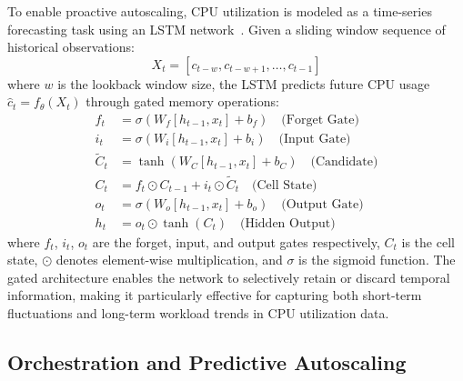 \documentclass[sn-nature]{sn-jnl}
\theoremstyle{thmstyleone}
\theoremstyle{thmstyletwo}
\theoremstyle{thmstylethree}
\begin{document}
To enable proactive autoscaling, CPU utilization is modeled as a time-series forecasting task using an LSTM network~\cite{hochreiter1997lstm}.
Given a sliding window sequence of historical observations:
\begin{equation}
X_t = [c_{t-w}, c_{t-w+1}, \ldots, c_{t-1}]
\end{equation}
where $w$ is the lookback window size, the LSTM predicts future CPU usage $\hat{c}_t = f_{\theta}(X_t)$ through gated memory operations:
\begin{align}
f_t &= \sigma(W_f [h_{t-1}, x_t] + b_f) \quad \text{(Forget Gate)} \label{eq:forget}\\
i_t &= \sigma(W_i [h_{t-1}, x_t] + b_i) \quad \text{(Input Gate)} \label{eq:input}\\
\tilde{C}_t &= \tanh(W_C [h_{t-1}, x_t] + b_C) \quad \text{(Candidate)} \label{eq:candidate}\\
C_t &= f_t \odot C_{t-1} + i_t \odot \tilde{C}_t \quad \text{(Cell State)} \label{eq:cell}\\
o_t &= \sigma(W_o [h_{t-1}, x_t] + b_o) \quad \text{(Output Gate)} \label{eq:output}\\
h_t &= o_t \odot \tanh(C_t) \quad \text{(Hidden Output)} \label{eq:hidden}
\end{align}
where $f_t$, $i_t$, $o_t$ are the forget, input, and output 
gates respectively, $C_t$ is the cell state, $\odot$ denotes element-wise multiplication, and $\sigma$ is the sigmoid function.
The gated architecture enables the network to selectively retain or discard temporal information, making it particularly effective for capturing both short-term fluctuations and long-term workload trends in CPU utilization data.

\subsection{Orchestration and Predictive Autoscaling}\label{subsec:orchestration}
\end{document}
